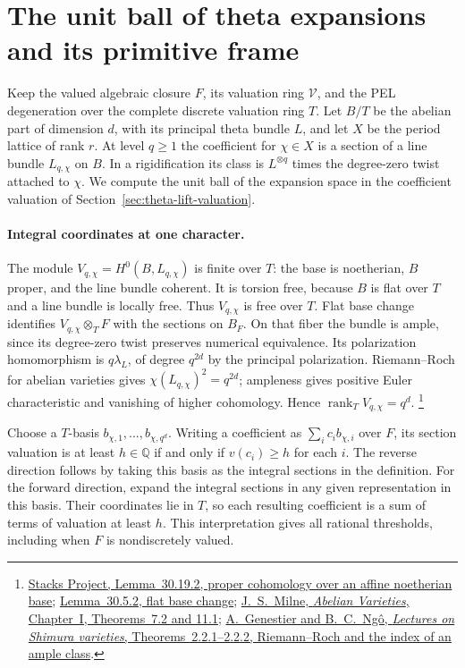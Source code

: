\section{The unit ball of theta expansions and its primitive frame}
\label{sec:theta-unit-basis}

Keep the valued algebraic closure \(F\), its valuation ring
\(\mathcal V\), and the PEL degeneration over the complete discrete
valuation ring \(T\). Let \(B/T\) be the abelian part of dimension
\(d\), with its principal theta bundle \(L\), and let \(X\) be the
period lattice of rank \(r\). At level \(q\ge1\) the coefficient for
\(\chi\in X\) is a section of a line bundle \(L_{q,\chi}\) on \(B\).
In a rigidification its class is \(L^{\otimes q}\) times the
degree-zero twist attached to \(\chi\). We compute the unit ball of
the expansion space in the coefficient valuation of
Section~\ref{sec:theta-lift-valuation}.

\paragraph{Integral coordinates at one character.}
The module \(V_{q,\chi}=H^0(B,L_{q,\chi})\) is finite over \(T\):
the base is noetherian, \(B\) proper, and the line bundle coherent.
It is torsion free, because \(B\) is flat over \(T\) and a line
bundle is locally free. Thus \(V_{q,\chi}\) is free over \(T\).
Flat base change identifies \(V_{q,\chi}\otimes_T F\) with the
sections on \(B_F\). On that fiber the bundle is ample, since its
degree-zero twist preserves numerical equivalence. Its polarization
homomorphism is \(q\lambda_L\), of degree \(q^{2d}\) by the principal
polarization. Riemann--Roch for abelian varieties gives
\(\chi(L_{q,\chi})^2=q^{2d}\); ampleness gives positive Euler
characteristic and vanishing of higher cohomology. Hence
\(\operatorname{rank}_T V_{q,\chi}=q^d\).
\footnote{\href{https://stacks.math.columbia.edu/tag/02O6}{Stacks Project,
Lemma~30.19.2, proper cohomology over an affine noetherian base};
\href{https://stacks.math.columbia.edu/tag/02KH}{Lemma~30.5.2, flat base change};
\href{https://jmilne.org/math/CourseNotes/AV.pdf}{J.~S.~Milne,
\emph{Abelian Varieties}, Chapter~I, Theorems~7.2 and 11.1};
\href{https://wiki.epfl.ch/shimvar/documents/IHESlectures-Genestier-Ngo.pdf}{A.~Genestier
and B.~C.~Ng\^o, \emph{Lectures on Shimura varieties},
Theorems~2.2.1--2.2.2, Riemann--Roch and the index of an ample class}.}

Choose a \(T\)-basis \(b_{\chi,1},\ldots,b_{\chi,q^d}\).
Writing a coefficient as \(\sum_i c_i b_{\chi,i}\) over \(F\),
its section valuation is at least \(h\in\mathbb Q\) if and only
if \(v(c_i)\ge h\) for each \(i\). The reverse direction follows
by taking this basis as the integral sections in the definition.
For the forward direction, expand the integral sections in any
given representation in this basis. Their coordinates lie in \(T\),
so each resulting coefficient is a sum of terms of valuation at
least \(h\). This interpretation gives all rational thresholds,
including when \(F\) is nondiscretely valued.

